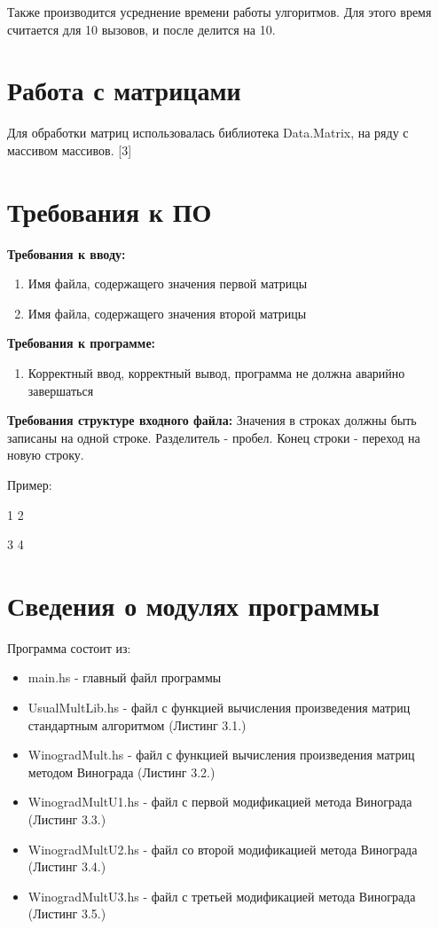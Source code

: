 \documentclass[12pt]{report}
\begin{document}
Также производится усреднение времени работы улгоритмов. Для этого время считается для 10 вызовов, и после делится на 10.

\section{Работа с матрицами}
Для обработки матриц использовалась библиотека Data.Matrix, на ряду с массивом массивов. [3]

\section{Требования к ПО}

\textbf{Требования к вводу:}
\begin{enumerate}
	\item Имя файла, содержащего значения первой матрицы
	\item Имя файла, содержащего значения второй матрицы
\end{enumerate}
\textbf{Требования к программе:}
\begin{enumerate}
  	\item Корректный ввод, корректный вывод, программа не должна аварийно завершаться
\end{enumerate}

\textbf{Требования структуре входного файла:}
	Значения в строках должны быть записаны на одной строке. Разделитель - пробел. Конец строки - переход на новую строку.
	
	Пример:
\begin{center}
	1 2

	3 4
\end{center}

\section{Сведения о модулях программы}
Программа состоит из:
\begin{itemize}
	\item main.hs - главный файл программы
	\item UsualMultLib.hs - файл с функцией вычисления произведения матриц стандартным алгоритмом (Листинг 3.1.)
	\item WinogradMult.hs - файл с функцией вычисления произведения матриц методом Винограда (Листинг 3.2.)
	\item WinogradMultU1.hs - файл с первой модификацией метода Винограда (Листинг 3.3.)
	\item WinogradMultU2.hs - файл со второй модификацией метода Винограда (Листинг 3.4.)
	\item WinogradMultU3.hs - файл с третьей модификацией метода Винограда (Листинг 3.5.)
\end{itemize}
\end{document}
